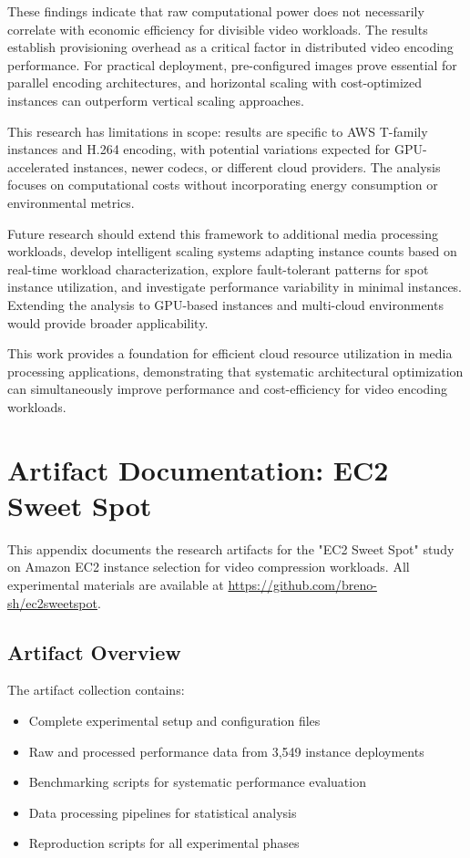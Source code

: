 \documentclass[conference]{IEEEtran}
\begin{document}
These findings indicate that raw computational power does not necessarily correlate with economic efficiency for divisible video workloads. The results establish provisioning overhead as a critical factor in distributed video encoding performance. For practical deployment, pre-configured images prove essential for parallel encoding architectures, and horizontal scaling with cost-optimized instances can outperform vertical scaling approaches.

This research has limitations in scope: results are specific to AWS T-family instances and H.264 encoding, with potential variations expected for GPU-accelerated instances, newer codecs, or different cloud providers. The analysis focuses on computational costs without incorporating energy consumption or environmental metrics.

Future research should extend this framework to additional media processing workloads, develop intelligent scaling systems adapting instance counts based on real-time workload characterization, explore fault-tolerant patterns for spot instance utilization, and investigate performance variability in minimal instances. Extending the analysis to GPU-based instances and multi-cloud environments would provide broader applicability.

This work provides a foundation for efficient cloud resource utilization in media processing applications, demonstrating that systematic architectural optimization can simultaneously improve performance and cost-efficiency for video encoding workloads.


\appendices
\section{Artifact Documentation: EC2 Sweet Spot}
\label{app:artifact}

This appendix documents the research artifacts for the "EC2 Sweet Spot" study on Amazon EC2 instance selection for video compression workloads. All experimental materials are available at \url{https://github.com/breno-sh/ec2sweetspot}.

\subsection{Artifact Overview}

The artifact collection contains:

\begin{itemize}
	\item Complete experimental setup and configuration files
	\item Raw and processed performance data from 3,549 instance deployments
	\item Benchmarking scripts for systematic performance evaluation
	\item Data processing pipelines for statistical analysis
	\item Reproduction scripts for all experimental phases
\end{itemize}
\end{document}
